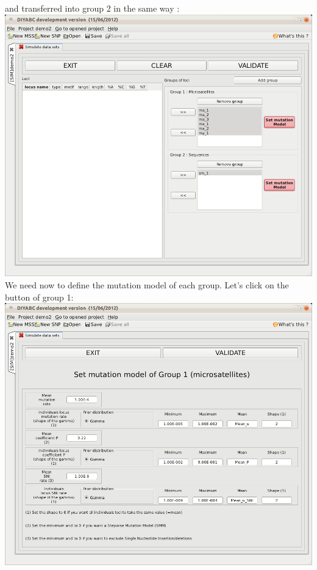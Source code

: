 and transferred into group 2 in the same way :\\

\includegraphics[scale=0.33]{gui_pictures/Capture-DIYABC-79.png} \\

We need now to define the mutation model of each group. Let's click on the  button of group 1:\\

\includegraphics[scale=0.33]{gui_pictures/Capture-DIYABC-80.png} \\

